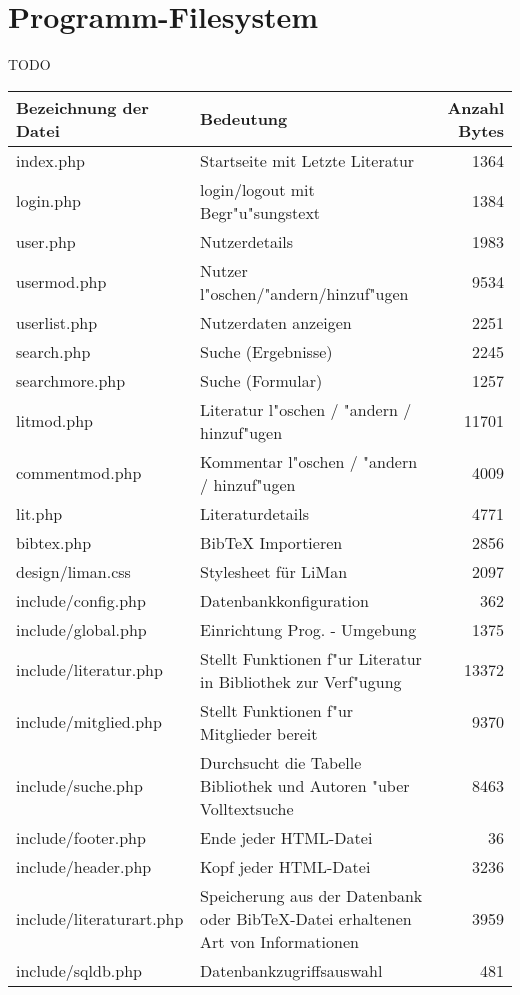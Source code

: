 \section{Programm-Filesystem}
{TODO}
\begin{longtable}{|l|p{6cm}|r|}
\hline
{\bf Bezeichnung der Datei} & {\bf Bedeutung} & {\bf Anzahl Bytes}\\
\hline\hline
\endhead

index.php & Startseite mit Letzte Literatur & 1364\\
\hline
login.php & login/logout mit Begr"u"sungstext & 1384\\
\hline
user.php & Nutzerdetails & 1983\\
\hline
usermod.php & Nutzer l"oschen/"andern/hinzuf"ugen & 9534\\
\hline
userlist.php & Nutzerdaten anzeigen & 2251\\
\hline
search.php & Suche (Ergebnisse) & 2245\\
\hline
searchmore.php & Suche (Formular) & 1257\\
\hline
litmod.php & Literatur l"oschen / "andern / hinzuf"ugen & 11701\\
\hline
commentmod.php & Kommentar l"oschen / "andern / hinzuf"ugen & 4009\\
\hline
lit.php & Literaturdetails & 4771\\
\hline
bibtex.php & BibTeX Importieren & 2856\\
\hline
design/liman.css & Stylesheet für LiMan & 2097\\
\hline
include/config.php & Datenbankkonfiguration & 362\\
\hline
include/global.php & Einrichtung Prog. - Umgebung & 1375\\
\hline
include/literatur.php & Stellt Funktionen f"ur Literatur in Bibliothek zur Verf"ugung & 13372\\
\hline
include/mitglied.php & Stellt Funktionen f"ur Mitglieder bereit & 9370\\
\hline
include/suche.php & Durchsucht die Tabelle Bibliothek und Autoren "uber Volltextsuche & 8463\\
\hline
include/footer.php & Ende jeder HTML-Datei & 36 \\
\hline
include/header.php & Kopf jeder HTML-Datei & 3236 \\
\hline
include/literaturart.php & Speicherung aus der Datenbank oder BibTeX-Datei erhaltenen Art von Informationen & 3959\\
\hline
include/sqldb.php & Datenbankzugriffsauswahl & 481 \\

\end{longtable}
